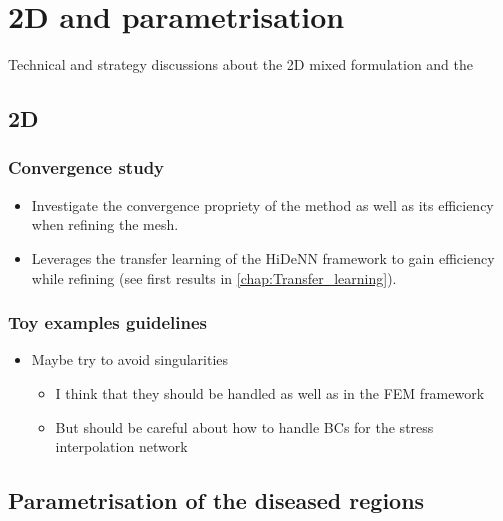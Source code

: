 \chapter[[The 29$^{\text{th}}$ of March 2024 - 2D and parametrisation]{2D and parametrisation}


\begin{chapabstract}
	Technical and strategy discussions about the 2D mixed formulation and the 
\end{chapabstract}


\minitoc



\section{2D}

\subsection{Convergence study}

\begin{itemize}
	\item Investigate the convergence propriety of the method as well as its efficiency when refining the mesh.
	\item Leverages the transfer learning of the HiDeNN framework to gain efficiency while refining (see first results in \cref{chap:Transfer_learning}).
\end{itemize}

\subsection{Toy examples guidelines}

\begin{itemize}
	\item Maybe try to avoid singularities
	\begin{itemize}
		\item I think that they should be handled as well as in the FEM framework
		\item But should be careful about how to handle BCs for the stress interpolation network
	\end{itemize}
\end{itemize}


\section{Parametrisation of the diseased regions}

